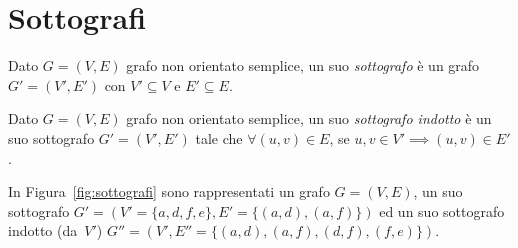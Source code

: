 \section{Sottografi}
\begin{defn}[sottografo]
Dato  $G=(V,E)$ grafo non orientato semplice, un suo \emph{sottografo} è un grafo
$G'=(V',E')$ con $V' \subseteq V$ e $E' \subseteq E$.
\end{defn}

\begin{defn}
Dato  $G=(V,E)$ grafo non orientato semplice, un suo \emph{sottografo indotto} è un 
suo sottografo ${G'=(V',E')}$ tale che ${\forall (u,v) \in E}$, se
${u,v \in V' \implies (u,v) \in E'}$.
\end{defn}

\begin{ese}
In Figura~\ref{fig:sottografi} sono rappresentati un grafo ${G=(V,E)}$, un suo sottografo
$G'=(V' = \{a,d,f,e\}, E'= \{ (a,d), (a,f) \})$ ed un suo sottografo indotto (da~$V'$)
$G''=(V', E''= \{ (a,d), (a,f), (d,f), (f,e) \})$.
\begin{figure}[H]
    \centering
\end{figure}
\end{ese}

